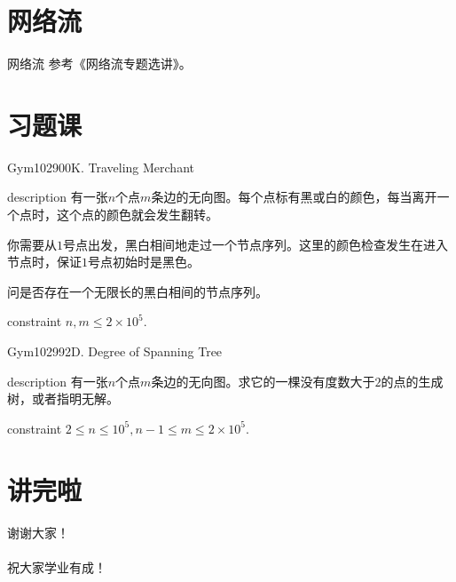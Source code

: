 \documentclass{beamer}
\def\le{\leqslant}
\begin{document}
\section{网络流}
\begin{frame}{网络流}
	参考《网络流专题选讲》。
\end{frame}
\section{习题课}
\begin{frame}{Gym102900K. Traveling Merchant}
	\begin{block}{description}
		有一张$n$个点$m$条边的无向图。每个点标有黑或白的颜色，每当离开一个点时，这个点的颜色就会发生翻转。

		你需要从$1$号点出发，黑白相间地走过一个节点序列。这里的颜色检查发生在进入节点时，保证$1$号点初始时是黑色。

		问是否存在一个无限长的黑白相间的节点序列。
	\end{block}
	\begin{block}{constraint}
		$n, m \le 2 \times 10^5.$
	\end{block}
\end{frame}
\begin{frame}{Gym102992D. Degree of Spanning Tree}
	\begin{block}{description}
		有一张$n$个点$m$条边的无向图。求它的一棵没有度数大于$2$的点的生成树，或者指明无解。
	\end{block}
	\begin{block}{constraint}
		$2 \le n \le 10^5, n - 1 \le m \le 2 \times 10^5.$
	\end{block}
\end{frame}

\section{讲完啦}
\begin{frame}
	\begin{center}
		{\huge 谢谢大家！\\~\\  \large 祝大家学业有成！}
	\end{center}
\end{frame}
\end{document}
